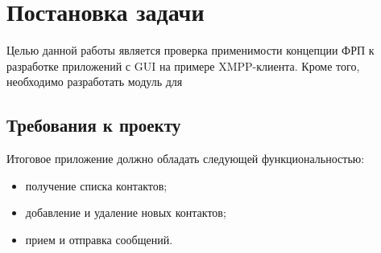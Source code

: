 \section{Постановка задачи}
Целью данной работы является проверка применимости концепции ФРП к разработке приложений с GUI на примере XMPP-клиента.
Кроме того, необходимо разработать модуль для 

\subsection{Требования к проекту}
Итоговое приложение должно обладать следующей функциональностью:
\begin{itemize}
    \item получение списка контактов;
    \item добавление и удаление новых контактов;
    \item прием и отправка сообщений.
\end{itemize}